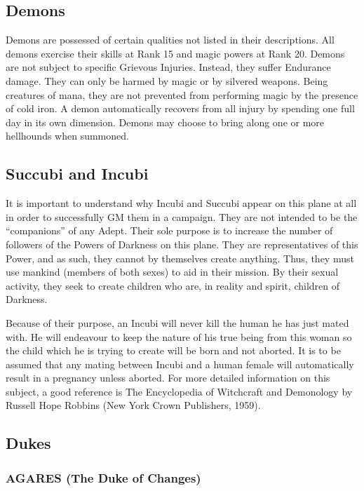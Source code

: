 \begin{multicols}{2}

\setlength\columnseprule{0.2mm}

\section{Demons}
Demons are possessed of certain qualities not listed in their
descriptions.  All demons exercise their skills at Rank 15 and magic
powers at Rank 20.  Demons are not subject to specific Grievous
Injuries.  Instead, they suffer Endurance damage.  They can only be
harmed by magic or by silvered weapons.  Being creatures of mana, they
are not prevented from performing magic by the presence of cold iron.
A demon automatically recovers from all injury by spending one full
day in its own dimension.  Demons may choose to bring along one or
more hellhounds when summoned.

\subsection{Succubi and Incubi}
It is important to understand why Incubi and Succubi appear on this
plane at all in order to successfully GM them in a campaign.  They are
not intended to be the ``companions'' of any Adept.  Their sole
purpose is to increase the number of followers of the Powers of
Darkness on this plane.  They are representatives of this Power, and
as such, they cannot by themselves create anything.  Thus, they must
use mankind (members of both sexes) to aid in their mission.  By their
sexual activity, they seek to create children who are, in reality and
spirit, children of Darkness.

Because of their purpose, an Incubi will never kill the human he has
just mated with.  He will endeavour to keep the nature of his true
being from this woman so the child which he is trying to create will
be born and not aborted.  It is to be assumed that any mating between
Incubi and a human female will automatically result in a pregnancy
unless aborted.  For more detailed information on this subject, a good
reference is The Encyclopedia of Witchcraft and Demonology by Russell
Hope Robbins (New York Crown Publishers, 1959).

\subsection{Dukes}

\subsubsection{AGARES (The Duke of Changes)}


\end{multicols}
